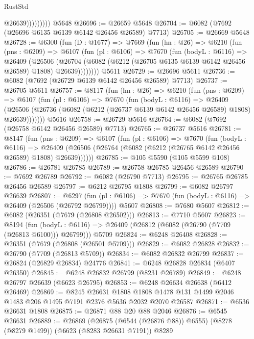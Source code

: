 \begin{lexlean}{RustStd}
\begin{coremodule}
                      @26639)))))))))
    @5648
@26696 := @26659 @5648
@26704 := @6082 (@7692 (@26696 @6135 @6139 @6142 @26456 @26589) @7713)
@26705 := @26669 @5648
@26728 := @6300
    (fun (D : @1677) =>
    @7669
      (fun (hn : @26) =>
      @6210
        (fun (pns : @6209) =>
        @6107
          (fun (pl : @6106) =>
          @7670
            (fun (bodyL : @6116) =>
            @26409
              (@26506
                (@26704 (@6082 (@6212 (@26705 @6135 @6139 @6142 @26456 @26589) @1808) @26639))))))))
    @5611
@26729 := @26696 @5611
@26736 := @6082 (@7692 (@26729 @6139 @6142 @26456 @26589) @7713)
@26737 := @26705 @5611
@26757 := @8117
    (fun (hn : @26) =>
    @6210
      (fun (pns : @6209) =>
      @6107
        (fun (pl : @6106) =>
        @7670
          (fun (bodyL : @6116) =>
          @26409
            (@26506 (@26736 (@6082 (@6212 (@26737 @6139 @6142 @26456 @26589) @1808) @26639)))))))
    @5616
@26758 := @26729 @5616
@26764 := @6082 (@7692 (@26758 @6142 @26456 @26589) @7713)
@26765 := @26737 @5616
@26781 := @8147
    (fun (pns : @6209) =>
    @6107
      (fun (pl : @6106) =>
      @7670
        (fun (bodyL : @6116) =>
        @26409 (@26506 (@26764 (@6082 (@6212 (@26765 @6142 @26456 @26589) @1808) @26639))))))
@26785 := @105 @5590 (@105 @5599 @108)
@26786 := @26781 @26785
@26789 := @26758 @26785 @26456 @26589
@26790 := @7692 @26789
@26792 := @6082 (@26790 @7713)
@26795 := @26765 @26785 @26456 @26589
@26797 := @6212 @26795 @1808
@26799 := @6082 @26797 @26639
@26807 := @6297
    (fun (pl : @6106) => @7670 (fun (bodyL : @6116) => @26409 (@26506 (@26792 @26799))))
    @5607
@26808 := @7680 @5607
@26812 := @6082 (@26351 (@7679 (@26808 @26502)))
@26813 := @7710 @5607
@26823 := @8194
    (fun (bodyL : @6116) => @26409 (@26812 (@6082 (@26790 (@7709 (@26813 @6100))) @26799)))
    @5709
@26824 := @6248 @26408
@26828 := @26351 (@7679 (@26808 (@26501 @5709)))
@26829 := @6082 @26828
@26832 := @26790 (@7709 (@26813 @5709))
@26834 := @6082 @26832 @26799
@26837 := @26824 (@26829 @26834) @24776
@26841 := @6248 @26828 @26834 (@6407 @26350)
@26845 := @6248 @26832 @26799 (@8231 @26789)
@26849 := @6248 @26797 @26639 (@6623 @26795)
@26853 := @6248 @26634 @26638 (@6412 @26469)
@26869 := @8245
    @26631
    @1808
    @1808
    @1478
    @131
    @1499
    @2046
    @1483
    @206
    @1495
    @7191
    @2376
    @5636
    @2032
    @2070
    @26587
@26871 := @6536 @26631 @1808
@26875 := @26871 @88 @20 @88 @2046
@26876 := @6545 @26631
@26889 := @26869
    (@26875 (@6544 (@26876 @88)) @6555)
    (@8278 (@8279 @1499))
    (@6623 (@8283 @26631 @7191))
    @8289

\end{coremodule}
\end{lexlean}

